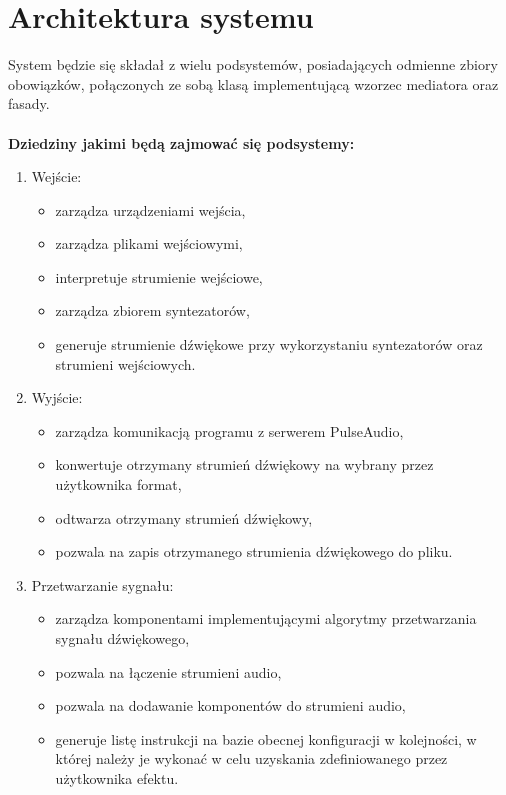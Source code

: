 \section{Architektura systemu}
System będzie się składał z wielu podsystemów, posiadających odmienne zbiory obowiązków, połączonych ze sobą klasą implementującą wzorzec mediatora oraz fasady.
\\\\
\textbf{Dziedziny jakimi będą zajmować się podsystemy:}
\begin{enumerate}
    \item Wejście:
        \begin{itemize}
            \item zarządza urządzeniami wejścia,
            \item zarządza plikami wejściowymi,
            \item interpretuje strumienie wejściowe,
            \item zarządza zbiorem syntezatorów,
            \item generuje strumienie dźwiękowe przy wykorzystaniu syntezatorów oraz strumieni wejściowych.
        \end{itemize}
    \item Wyjście:
        \begin{itemize}
            \item zarządza komunikacją programu z serwerem PulseAudio,
            \item konwertuje otrzymany strumień dźwiękowy na wybrany przez użytkownika format,
            \item odtwarza otrzymany strumień dźwiękowy,
            \item pozwala na zapis otrzymanego strumienia dźwiękowego do pliku.
        \end{itemize}
    \item Przetwarzanie sygnału:
        \begin{itemize}
            \item zarządza komponentami implementującymi algorytmy przetwarzania sygnału dźwiękowego,
            \item pozwala na łączenie strumieni audio,
            \item pozwala na dodawanie komponentów do strumieni audio,
            \item generuje listę instrukcji na bazie obecnej konfiguracji w kolejności, w której należy je wykonać w celu uzyskania zdefiniowanego przez użytkownika efektu.
        \end{itemize}

\end{enumerate}
